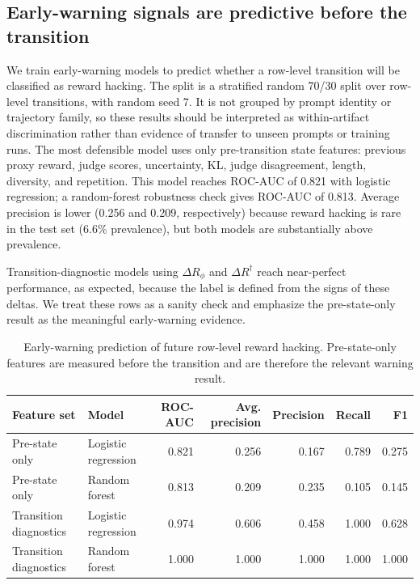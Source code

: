 \documentclass[11pt]{article}
\newcommand{\Rphi}{R_{\phi}}
\newcommand{\Rdag}{R^{\dagger}}
\newcommand{\delt}{\Delta}
\begin{document}
\subsection{Early-warning signals are predictive before the transition}
We train early-warning models to predict whether a row-level transition will be classified as reward hacking. The split is a stratified random 70/30 split over row-level transitions, with random seed 7. It is not grouped by prompt identity or trajectory family, so these results should be interpreted as within-artifact discrimination rather than evidence of transfer to unseen prompts or training runs. The most defensible model uses only pre-transition state features: previous proxy reward, judge scores, uncertainty, KL, judge disagreement, length, diversity, and repetition. This model reaches ROC-AUC of 0.821 with logistic regression; a random-forest robustness check gives ROC-AUC of 0.813. Average precision is lower (0.256 and 0.209, respectively) because reward hacking is rare in the test set (6.6\% prevalence), but both models are substantially above prevalence.

Transition-diagnostic models using $\delt\Rphi$ and $\delt\Rdag$ reach near-perfect performance, as expected, because the label is defined from the signs of these deltas. We treat these rows as a sanity check and emphasize the pre-state-only result as the meaningful early-warning evidence.

\begin{table}[t]
\centering
\small
\caption{Early-warning prediction of future row-level reward hacking. Pre-state-only features are measured before the transition and are therefore the relevant warning result.}
\label{tab:early-warning}
\begin{tabular}{llrrrrr}
\toprule
Feature set & Model & ROC-AUC & Avg. precision & Precision & Recall & F1 \\
\midrule
Pre-state only & Logistic regression & 0.821 & 0.256 & 0.167 & 0.789 & 0.275 \\
Pre-state only & Random forest & 0.813 & 0.209 & 0.235 & 0.105 & 0.145 \\
Transition diagnostics & Logistic regression & 0.974 & 0.606 & 0.458 & 1.000 & 0.628 \\
Transition diagnostics & Random forest & 1.000 & 1.000 & 1.000 & 1.000 & 1.000 \\
\bottomrule
\end{tabular}
\end{table}
\end{document}
